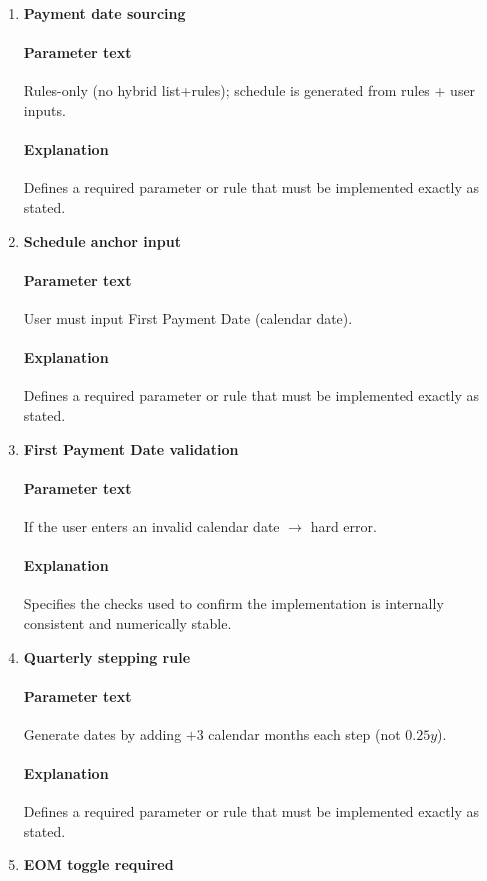 \documentclass[11pt]{article}
\begin{document}
\begin{enumerate}[label=\arabic*),leftmargin=*,align=left]
\item \textbf{Payment date sourcing}
\paragraph{Parameter text} Rules-only (no hybrid list+rules); schedule is generated from rules + user inputs.
\paragraph{Explanation} Defines a required parameter or rule that must be implemented exactly as stated.

\item \textbf{Schedule anchor input}
\paragraph{Parameter text} User must input First Payment Date (calendar date).
\paragraph{Explanation} Defines a required parameter or rule that must be implemented exactly as stated.

\item \textbf{First Payment Date validation}
\paragraph{Parameter text} If the user enters an invalid calendar date $\rightarrow$ hard error.
\paragraph{Explanation} Specifies the checks used to confirm the implementation is internally consistent and numerically stable.

\item \textbf{Quarterly stepping rule}
\paragraph{Parameter text} Generate dates by adding $+3$ calendar months each step (not $0.25y$).
\paragraph{Explanation} Defines a required parameter or rule that must be implemented exactly as stated.

\item \textbf{EOM toggle required}

\end{enumerate}
\end{document}
